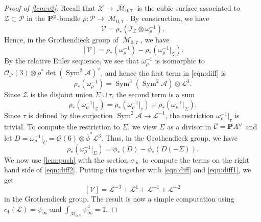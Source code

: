 \documentclass[reqno]{amsart}
\DeclareMathOperator{\M}{\mathcal{M}}
\renewcommand{\to}{{\longrightarrow}}
\renewcommand {\P}{{\bf P}}
\providecommand{\Sym}{\operatorname{Sym}}
\numberwithin{equation}{section}
\renewcommand{\O}{\mathcal{O}}
\begin{document}
\begin{proof}[Proof of \autoref{lem:v2}]
  Recall that $\mathcal{X} \to \overline{\M}_{0,7}$ is the cubic surface associated to $\mathcal{Z} \subset \mathcal{P}$ in the $\P^2$-bundle $\rho \colon \mathcal{P} \to \overline{\M}_{0,7}$.
  By construction, we have
  \[ \mathcal{V} = \rho_*(\mathcal{I}_{\mathcal{Z}} \otimes \omega^{-1}_{\rho}).\]
  Hence, in the Grothendieck group of $\overline{\M}_{0,7}$, we have
  \begin{equation}\label{eqn:diff}
    [\mathcal{V}] = \rho_*(\omega_{\rho}^{-1}) - \rho_*(\omega_{\rho}^{-1}|_{\mathcal{Z}}).
  \end{equation}
  By the relative Euler sequence, we see that $\omega^{-1}_{\rho}$ is isomorphic to $\O_{\mathcal{P}}(3) \otimes \rho^* \det (\Sym^2 \mathcal{A})^{\vee}$, and hence the first term in \eqref{eqn:diff} is
  \begin{equation}\label{eqn:diff1}
    \rho_*(\omega_{\rho}^{-1}) = \Sym^3(\Sym^2 \mathcal{A}) \otimes \mathcal{L}^3.
  \end{equation}
  Since $\mathcal{Z}$ is the disjoint union $\Sigma \cup \tau$, the second term is a sum
  \[ \rho_*(\omega_{\rho}^{-1}|_{\mathcal{Z}}) = \rho_*(\omega_{\rho}^{-1}|_{\tau}) + \rho_*(\omega_{\rho}^{-1}|_{\Sigma}). \]
  Since $\tau$ is defined by the surjection $\Sym^2 \mathcal{A} \to \mathcal{L}^{-1}$, the restriction $\omega_{\rho}^{-1}|_{\tau}$ is trivial.
  To compute the restriction to $\Sigma$, we view $\Sigma$ as a divisor in $\overline{\mathcal{C}} = \P A^{\vee}$ and let $D = \omega_{\rho}^{-1}|_{\overline C} = \O(6) \otimes \overline{\phi}^* \mathcal{L}^3$.
  Thus, in the Grothendieck group, we have
  \begin{equation}\label{eqn:diff2}
    \rho_*(\omega_{\rho}^{-1}|_{\Sigma}) = \overline{\phi}_*\left(D\right) - \overline{\phi}_* \left( D(-\Sigma)\right).
  \end{equation}
  We now use \autoref{lem:push} with the section $\sigma_{\infty}$ to compute the terms on the right hand side of \eqref{eqn:diff2}.
  Putting this together with \eqref{eqn:diff} and \eqref{eqn:diff1}, we get
  \[ [\mathcal{V}] = \mathcal{L}^{-3}+ \mathcal{L}^{1}+ \mathcal{L}^{-1}+ \mathcal{L}^{-2}\]
  in the Grothendieck group.
  The result is now a simple computation using $c_1(\mathcal{L}) = \psi_{\infty}$ and $\int_{\overline{\M}_{0,7}} \psi_{\infty}^4 = 1$.
\end{proof}
\end{document}
